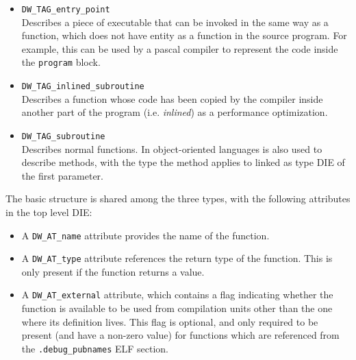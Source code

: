 \begin{itemize}
  \item \verb|DW_TAG_entry_point| \hfill \\
    Describes a piece of executable that can be invoked in the same way as
    a function, which does not have entity as a function in the source
    program. For example, this can be used by a \gls{pascal} compiler to
    represent the code inside the \texttt{program} block.
  \item \verb|DW_TAG_inlined_subroutine| \hfill \\
    Describes a function whose code has
    been copied by the compiler inside another part of the program (i.e.
    \emph{inlined}) as a performance optimization.
  \item \verb|DW_TAG_subroutine| \hfill \\
    Describes normal functions. In \gls{object-oriented} languages is also
    used to describe methods, with the type the method applies to linked
    as type DIE of the first parameter. 
\end{itemize}

The basic structure is shared among the three types, with the following
attributes in the top level DIE:

\begin{itemize}
  \item A \verb|DW_AT_name| attribute provides the name of the function.
  \item A \verb|DW_AT_type| attribute references the return type of the
    function. This is only present if the function returns a value.
  \item A \verb|DW_AT_external| attribute, which contains a flag indicating
    whether the function is available to be used from compilation units other
    than the one where its definition lives. This flag is optional, and only
    required to be present (and have a non-zero value) for functions which
    are referenced from the \verb|.debug_pubnames| ELF section.
\end{itemize}

